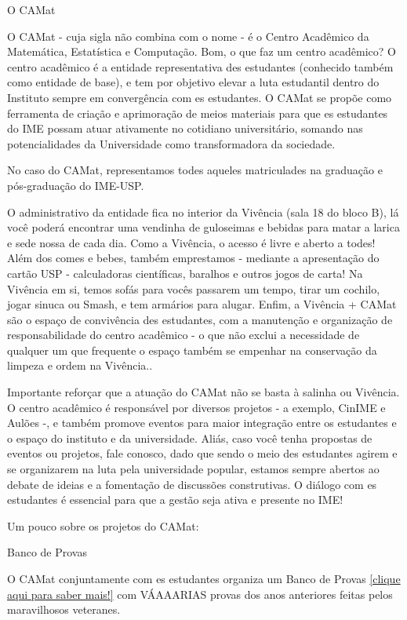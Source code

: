 \begin{secao}{O CAMat}

O CAMat - cuja sigla não combina com o nome - é o Centro Acadêmico da
Matemática, Estatística e Computação. Bom, o que faz um centro acadêmico? 
O centro acadêmico é a entidade representativa des estudantes (conhecido 
também como entidade de base), e tem por objetivo elevar a luta estudantil 
dentro do Instituto sempre em convergência com es estudantes. O CAMat se 
propõe como ferramenta de criação e aprimoração de meios materiais para que 
es estudantes do IME possam atuar ativamente no cotidiano universitário, 
somando nas potencialidades da Universidade como transformadora da sociedade. 

No caso do CAMat, representamos todes aqueles matriculades na graduação e pós-graduação do IME-USP.

O administrativo da entidade fica no interior da Vivência (sala 18 do bloco B), lá você 
poderá encontrar uma vendinha de guloseimas e bebidas para matar a larica e sede nossa de
cada dia. Como a Vivência,  o acesso é livre e aberto a todes! Além dos
comes e bebes, também emprestamos - mediante a apresentação do cartão USP -
calculadoras científicas, baralhos e outros jogos de carta! Na Vivência em si, temos sofás
para vocês passarem um tempo, tirar um cochilo, jogar sinuca ou Smash, e
tem armários para alugar. Enfim, a Vivência + CAMat são o espaço de convivência 
des estudantes, com a manutenção e organização de responsabilidade do centro acadêmico 
- o que não exclui a necessidade de qualquer um que frequente o espaço também se 
empenhar na conservação da limpeza e ordem na Vivência..

Importante reforçar que a atuação do CAMat não se basta à salinha ou Vivência. 
O centro acadêmico é responsável por diversos projetos - a exemplo, CinIME e Aulões 
-, e também promove eventos para maior integração entre os estudantes e o espaço do 
instituto e da universidade. Aliás, caso você tenha propostas de eventos ou projetos, 
fale conosco, dado que sendo o meio des estudantes agirem e se organizarem na luta pela 
universidade popular, estamos sempre abertos ao debate de ideias e a fomentação de discussões 
construtivas. O diálogo com es estudantes é essencial para que a gestão seja ativa e presente no IME!

Um pouco sobre os projetos do CAMat:


\begin{subsecao}{Banco de Provas}

O CAMat conjuntamente com es estudantes organiza um Banco de Provas
\href{https://camat.ime.usp.br/apoio/}{[clique aqui para saber mais!]}
com VÁAAARIAS provas dos anos anteriores feitas pelos maravilhosos veteranes.


\end{subsecao}
\end{secao}
